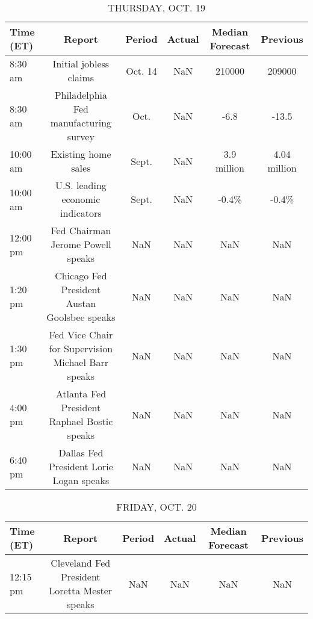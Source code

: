 \documentclass{article}%
\begin{document}
\begin{table}[htbp]%
\caption{THURSDAY, OCT. 19}%
\centering%
\begin{adjustbox}{width=1\textwidth}%
\begin{tabular}{lccccc}
\toprule
Time (ET) &                                             Report &  Period & Actual & Median Forecast &     Previous \\
\midrule
  8:30 am &                             Initial jobless claims & Oct. 14 &    NaN &          210000 &       209000 \\
  8:30 am &              Philadelphia Fed manufacturing survey &    Oct. &    NaN &            -6.8 &        -13.5 \\
 10:00 am &                                Existing home sales &   Sept. &    NaN &     3.9 million & 4.04 million \\
 10:00 am &                   U.S. leading economic indicators &   Sept. &    NaN &           -0.4\% &        -0.4\% \\
 12:00 pm &                  Fed Chairman Jerome Powell speaks &     NaN &    NaN &             NaN &          NaN \\
  1:20 pm &       Chicago Fed President Austan Goolsbee speaks &     NaN &    NaN &             NaN &          NaN \\
  1:30 pm & Fed Vice Chair for Supervision Michael Barr speaks &     NaN &    NaN &             NaN &          NaN \\
  4:00 pm &        Atlanta Fed President Raphael Bostic speaks &     NaN &    NaN &             NaN &          NaN \\
  6:40 pm &            Dallas Fed President Lorie Logan speaks &     NaN &    NaN &             NaN &          NaN \\
\bottomrule
\end{tabular}
%
\end{adjustbox}%
\end{table}

%


\begin{table}[htbp]%
\caption{FRIDAY, OCT. 20}%
\centering%
\begin{adjustbox}{width=1\textwidth}%
\begin{tabular}{lccccc}
\toprule
Time (ET) &                                        Report & Period & Actual & Median Forecast & Previous \\
\midrule
 12:15 pm & Cleveland Fed President Loretta Mester speaks &    NaN &    NaN &             NaN &      NaN \\
\bottomrule
\end{tabular}
%
\end{adjustbox}%
\end{table}
\end{document}
